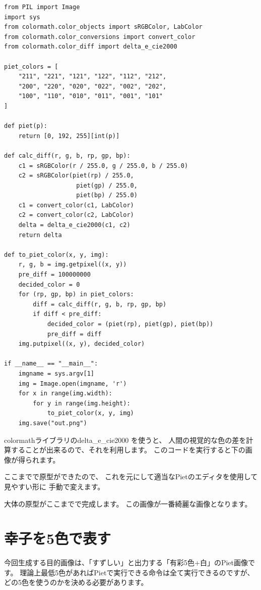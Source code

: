 \begin{lstlisting}
from PIL import Image
import sys
from colormath.color_objects import sRGBColor, LabColor
from colormath.color_conversions import convert_color
from colormath.color_diff import delta_e_cie2000

piet_colors = [
    "211", "221", "121", "122", "112", "212",
    "200", "220", "020", "022", "002", "202",
    "100", "110", "010", "011", "001", "101"
]

def piet(p):
    return [0, 192, 255][int(p)]

def calc_diff(r, g, b, rp, gp, bp):
    c1 = sRGBColor(r / 255.0, g / 255.0, b / 255.0)
    c2 = sRGBColor(piet(rp) / 255.0,
                    piet(gp) / 255.0,
                    piet(bp) / 255.0)
    c1 = convert_color(c1, LabColor)
    c2 = convert_color(c2, LabColor)
    delta = delta_e_cie2000(c1, c2)
    return delta

def to_piet_color(x, y, img):
    r, g, b = img.getpixel((x, y))
    pre_diff = 100000000
    decided_color = 0
    for (rp, gp, bp) in piet_colors:
        diff = calc_diff(r, g, b, rp, gp, bp)
        if diff < pre_diff:
            decided_color = (piet(rp), piet(gp), piet(bp))
            pre_diff = diff
    img.putpixel((x, y), decided_color)

if __name__ == "__main__":
    imgname = sys.argv[1]
    img = Image.open(imgname, 'r')
    for x in range(img.width):
        for y in range(img.height):
            to_piet_color(x, y, img)
    img.save("out.png")
\end{lstlisting}

colormathライブラリのdelta\_e\_cie2000 を使うと、
人間の視覚的な色の差を計算することが出来るので、それを利用します。
このコードを実行すると下の画像が得られます。


ここまでで原型ができたので、
これを元にして適当なPietのエディタを使用して見やすい形に
手動で変えます。


大体の原型がここまでで完成します。
この画像が一番綺麗な画像となります。

\section{幸子を5色で表す}

今回生成する目的画像は、「すずしい」と出力する「有彩5色+白」のPiet画像です。
理論上最低5色があればPietで実行できる命令は全て実行できるのですが、
どの5色を使うのかを決める必要があります。

